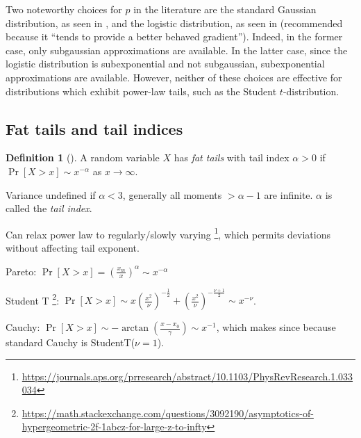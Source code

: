 \documentclass{scrartcl}
\theoremstyle{definition}
\newtheorem{definition}{Definition}[section]
\begin{document}
Two noteworthy choices for $p$ in the literature are the standard Gaussian distribution, as seen in  \cite{kingma2016improved}, and the logistic distribution, as seen in \cite{dinh2014nice} (recommended because it ``tends to provide a better behaved gradient''). Indeed, in the former case, only subgaussian approximations are available. In the latter case, since the logistic distribution is subexponential and not subgaussian, subexponential approximations are available. However, neither of these choices are effective for distributions which exhibit power-law tails, such as the Student $t$-distribution. 



\subsection{Fat tails and tail indices}

\begin{definition}[\cite{resnick2007heavy}]
    A random variable $X$ has \emph{fat tails} with
    tail index $\alpha > 0$
    if $\Pr[X > x] \sim x^{-\alpha}$ as $x \to \infty$.
\end{definition}

Variance undefined if $\alpha < 3$, generally all moments $> \alpha - 1$
are infinite. $\alpha$ is called the \emph{tail index}.

Can relax power law to regularly/slowly varying \footnote{\url{https://journals.aps.org/prresearch/abstract/10.1103/PhysRevResearch.1.033034}}, which permits deviations without
affecting tail exponent.

Pareto: $\Pr[X > x] = \left(\frac{x_m}{x}\right)^\alpha \sim x^{-\alpha}$

Student T \footnote{\url{https://math.stackexchange.com/questions/3092190/asymptotics-of-hypergeometric-2f-1abcz-for-large-z-to-infty}}: 
$\Pr[X > x] \sim x \left(\frac{x^2}{\nu}\right)^{-\frac{1}{2}} + \left(\frac{x^2}{\nu}\right)^{-\frac{\nu+1}{2}} \sim x^{-\nu}$.

Cauchy: $\Pr[X > x] \sim -\arctan\left(\frac{x - x_0}{\gamma}\right) \sim x^{-1}$,
which makes since because standard Cauchy is StudentT($\nu=1$).
\end{document}
